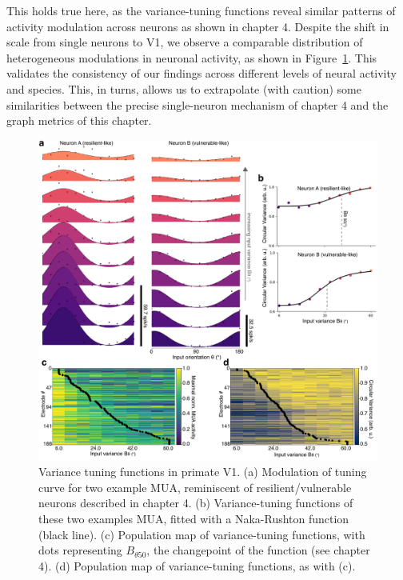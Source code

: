 This holds true here, as the variance-tuning functions reveal similar patterns of activity modulation across neurons as shown in chapter 4. Despite the shift in scale from single neurons to \gls{V1}, we observe a comparable distribution of heterogeneous modulations in neuronal activity, as shown in Figure~\ref{fig_chap5_nkr}. This validates the consistency of our findings across different levels of neural activity and species. This, in turns, allows us to extrapolate (with caution) some similarities between the precise single-neuron mechanism of chapter 4 and the graph metrics of this chapter.

\begin{figure}[h!tbp]
\vspace{0.1cm}
\centering
\includegraphics[width=1.\textwidth]{fig/chap5_nkr.pdf}
\caption[Variance tuning functions in primate V1.]{Variance tuning functions in primate \gls{V1}. (a) Modulation of tuning curve for two example \gls{MUA}, reminiscent of resilient/vulnerable neurons described in chapter 4. (b) Variance-tuning functions of these two examples \gls{MUA}, fitted with a Naka-Rushton function (black line). (c) Population map of variance-tuning functions, with dots representing $B_{\theta50}$, the changepoint of the function (see chapter 4). (d) Population map of variance-tuning functions, as with (c).}
\label{fig_chap5_nkr} 
\end{figure} 

